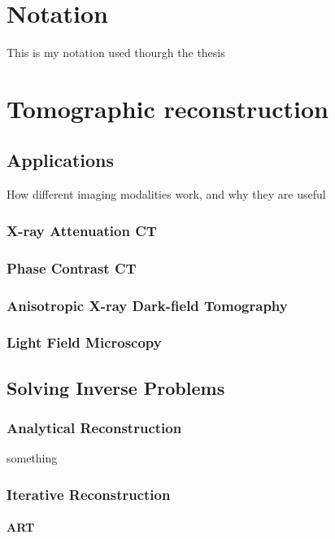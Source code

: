 \chapter{Notation}

This is my notation used thourgh the thesis

\chapter{Tomographic reconstruction}

\section{Applications}
 
How different imaging modalities work, and why they are useful

\subsection{X-ray Attenuation CT}

\subsection{Phase Contrast CT}

\subsection{Anisotropic X-ray Dark-field Tomography}

\subsection{Light Field Microscopy}

\section{Solving Inverse Problems}
 
\subsection{Analytical Reconstruction}
something

\subsection{Iterative Reconstruction}

\subsubsection{ART}

